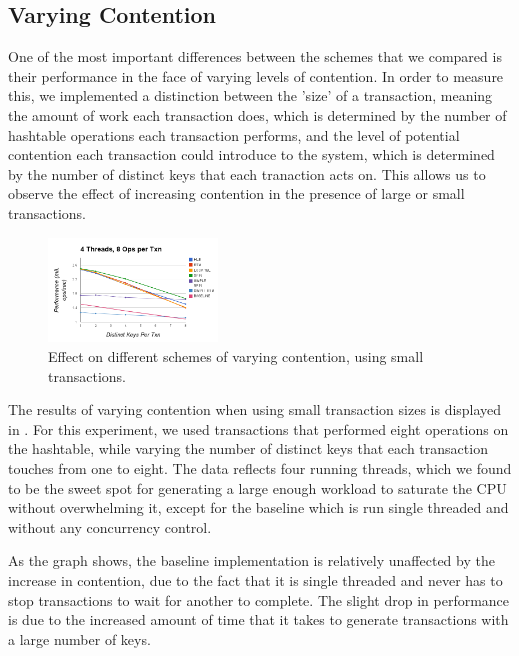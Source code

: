 \subsection{Varying Contention}

One of the most important differences between the schemes that we compared is 
their performance in the face of varying levels of contention. In order to 
measure this, we implemented a distinction between the 'size' of a transaction, 
meaning the amount of work each transaction does, which is determined by the 
number of hashtable operations each transaction performs,  and the level of 
potential contention each transaction could introduce to the system, which is 
determined by the number of distinct keys that each tranaction acts on. This 
allows us to observe the effect of increasing contention in the presence of 
large or small transactions.

\begin{figure}[h!]
  \centering
  \includegraphics[width=0.4\textwidth]{figure/small_txns.png}
  \caption{Effect on different schemes of varying contention, using small
    transactions.}
  \label{fig:small_txns} 
\end{figure}

The results of varying contention when using small transaction sizes is
displayed in . For this experiment, we used transactions
that performed eight operations on the hashtable, while varying the number of
distinct keys that each transaction touches from one to eight. The data reflects
four running threads, which we found to be the sweet spot for generating a large
enough workload to saturate the CPU without overwhelming it, except for the
baseline which is run single threaded and without any concurrency control.

As the graph shows, the baseline implementation is relatively unaffected by the
increase in contention, due to the fact that it is single threaded and never has
to stop transactions to wait for another to complete. The slight drop in
performance is due to the increased amount of time that it takes to generate
transactions with a large number of keys.

